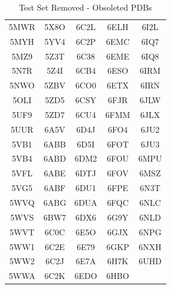 \documentclass[journal=jcisd8,manuscript=article]{achemso}
\begin{document}
\begin{center}
    \begin{table}[ht]
        \centering
        \begin{tabular}{|c c c c c|}
            \hline
            5MWR & 5X8O & 6C2L & 6ELH & 6I2L \\
            5MYH & 5YV4 & 6C2P & 6EMC & 6IQ7 \\
            5MZ9 & 5Z3T & 6C38 & 6EME & 6IQ8 \\
            5N7R & 5Z4I & 6CB4 & 6ESO & 6IRM \\
            5NWO & 5ZBV & 6CO0 & 6ETX & 6IRN \\
            5OLI & 5ZD5 & 6CSY & 6FJR & 6JLW \\
            5UF9 & 5ZD7 & 6CU4 & 6FMM & 6JLX \\
            5UUR & 6A5V & 6D4J & 6FO4 & 6JU2 \\
            5VB1 & 6ABB & 6D5I & 6FOT & 6JU3 \\
            5VB4 & 6ABD & 6DM2 & 6FOU & 6MPU \\
            5VFL & 6ABE & 6DTJ & 6FOV & 6MSZ \\
            5VG5 & 6ABF & 6DU1 & 6FPE & 6N3T \\
            5WVQ & 6ABG & 6DUA & 6FQC & 6NLC \\
            5WVS & 6BW7 & 6DX6 & 6G9Y & 6NLD \\
            5WVT & 6C0C & 6E5O & 6GJX & 6NPG \\
            5WW1 & 6C2E & 6E79 & 6GKP & 6NXH \\
            5WW2 & 6C2J & 6E7A & 6H7K & 6UHD \\
            5WWA & 6C2K & 6EDO & 6HBO &      \\
            \hline
        \end{tabular}
        \caption{Test Set Removed - Obsoleted PDBs}
        \label{table:testobsoleted}
    \end{table}
\end{center}
\clearpage
\end{document}
